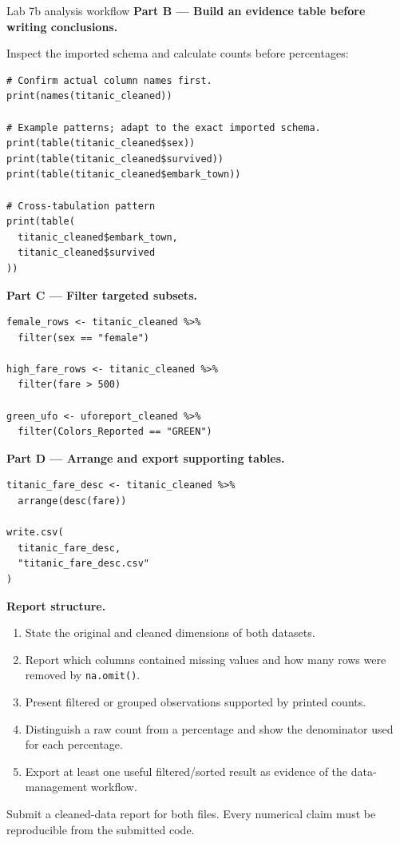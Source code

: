 \begin{labproject}{Lab 7b analysis workflow}
\textbf{Part B --- Build an evidence table before writing conclusions.}

Inspect the imported schema and calculate counts before percentages:

\begin{lstlisting}[style=dsr]
# Confirm actual column names first.
print(names(titanic_cleaned))

# Example patterns; adapt to the exact imported schema.
print(table(titanic_cleaned$sex))
print(table(titanic_cleaned$survived))
print(table(titanic_cleaned$embark_town))

# Cross-tabulation pattern
print(table(
  titanic_cleaned$embark_town,
  titanic_cleaned$survived
))
\end{lstlisting}

\textbf{Part C --- Filter targeted subsets.}

\begin{lstlisting}[style=dsr]
female_rows <- titanic_cleaned %>%
  filter(sex == "female")

high_fare_rows <- titanic_cleaned %>%
  filter(fare > 500)

green_ufo <- uforeport_cleaned %>%
  filter(Colors_Reported == "GREEN")
\end{lstlisting}

\textbf{Part D --- Arrange and export supporting tables.}

\begin{lstlisting}[style=dsr]
titanic_fare_desc <- titanic_cleaned %>%
  arrange(desc(fare))

write.csv(
  titanic_fare_desc,
  "titanic_fare_desc.csv"
)
\end{lstlisting}

\textbf{Report structure.}
\begin{enumerate}
  \item State the original and cleaned dimensions of both datasets.
  \item Report which columns contained missing values and how many rows were removed by \texttt{na.omit()}.
  \item Present filtered or grouped observations supported by printed counts.
  \item Distinguish a raw count from a percentage and show the denominator used for each percentage.
  \item Export at least one useful filtered/sorted result as evidence of the data-management workflow.
\end{enumerate}
\end{labproject}

\begin{labdeliverable}
Submit a cleaned-data report for both files. Every numerical claim must be reproducible from the submitted code.
\end{labdeliverable}
